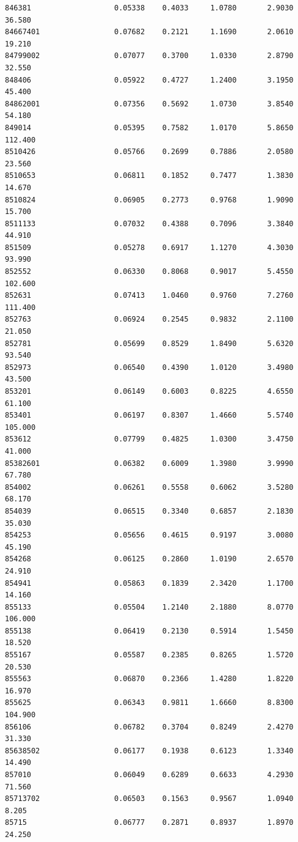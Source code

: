 \documentclass[
  letterpaper,
  DIV=11,
  numbers=noendperiod]{scrartcl}
\begin{document}
\begin{verbatim}
846381                   0.05338    0.4033     1.0780       2.9030  36.580
84667401                 0.07682    0.2121     1.1690       2.0610  19.210
84799002                 0.07077    0.3700     1.0330       2.8790  32.550
848406                   0.05922    0.4727     1.2400       3.1950  45.400
84862001                 0.07356    0.5692     1.0730       3.8540  54.180
849014                   0.05395    0.7582     1.0170       5.8650 112.400
8510426                  0.05766    0.2699     0.7886       2.0580  23.560
8510653                  0.06811    0.1852     0.7477       1.3830  14.670
8510824                  0.06905    0.2773     0.9768       1.9090  15.700
8511133                  0.07032    0.4388     0.7096       3.3840  44.910
851509                   0.05278    0.6917     1.1270       4.3030  93.990
852552                   0.06330    0.8068     0.9017       5.4550 102.600
852631                   0.07413    1.0460     0.9760       7.2760 111.400
852763                   0.06924    0.2545     0.9832       2.1100  21.050
852781                   0.05699    0.8529     1.8490       5.6320  93.540
852973                   0.06540    0.4390     1.0120       3.4980  43.500
853201                   0.06149    0.6003     0.8225       4.6550  61.100
853401                   0.06197    0.8307     1.4660       5.5740 105.000
853612                   0.07799    0.4825     1.0300       3.4750  41.000
85382601                 0.06382    0.6009     1.3980       3.9990  67.780
854002                   0.06261    0.5558     0.6062       3.5280  68.170
854039                   0.06515    0.3340     0.6857       2.1830  35.030
854253                   0.05656    0.4615     0.9197       3.0080  45.190
854268                   0.06125    0.2860     1.0190       2.6570  24.910
854941                   0.05863    0.1839     2.3420       1.1700  14.160
855133                   0.05504    1.2140     2.1880       8.0770 106.000
855138                   0.06419    0.2130     0.5914       1.5450  18.520
855167                   0.05587    0.2385     0.8265       1.5720  20.530
855563                   0.06870    0.2366     1.4280       1.8220  16.970
855625                   0.06343    0.9811     1.6660       8.8300 104.900
856106                   0.06782    0.3704     0.8249       2.4270  31.330
85638502                 0.06177    0.1938     0.6123       1.3340  14.490
857010                   0.06049    0.6289     0.6633       4.2930  71.560
85713702                 0.06503    0.1563     0.9567       1.0940   8.205
85715                    0.06777    0.2871     0.8937       1.8970  24.250

\end{verbatim}
\end{document}
